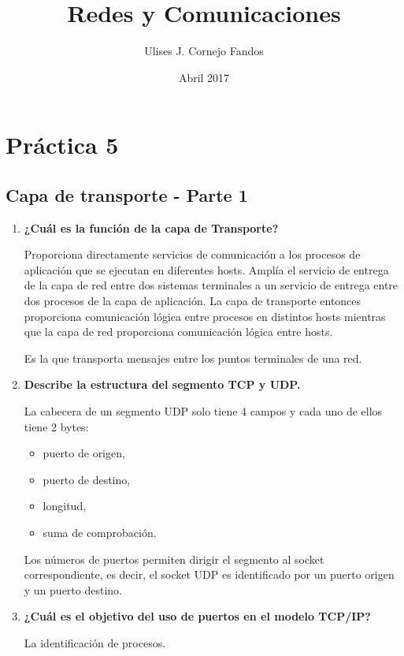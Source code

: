 \documentclass[a4paper,10pt]{article}
\title{Redes y Comunicaciones}
\author{Ulises J. Cornejo Fandos}
\date{Abril 2017}
\begin{document}
\maketitle

\section{Práctica 5}

\subsection{Capa de transporte - Parte 1}

\begin{enumerate}
    \item \textbf{¿Cuál es la función de la capa de Transporte?}
    
    Proporciona directamente servicios de comunicación a los procesos de aplicación que se ejecutan en diferentes hosts. Amplía el servicio de entrega de la capa de red entre dos sistemas terminales a un servicio de entrega entre dos procesos de la capa de aplicación. La capa de transporte entonces proporciona comunicación lógica entre procesos en distintos hosts mientras que la capa de red proporciona comunicación lógica entre hosts.
    
    Es la que transporta mensajes entre los puntos terminales de una red.
    
    \item \textbf{Describe la estructura del segmento TCP y UDP.}
    
    La cabecera de un segmento UDP solo tiene 4 campos y cada uno de ellos tiene 2 bytes:
        \begin{itemize}
            \item puerto de origen,
            \item puerto de destino, 
            \item longitud,
            \item suma de comprobación.
        \end{itemize}    
    
    Los números de puertos permiten dirigir el segmento al socket correspondiente, es decir, el socket UDP es identificado por un puerto origen y un puerto destino.
    
    \item \textbf{¿Cuál es el objetivo del uso de puertos en el modelo TCP/IP?}
    
    La identificación de procesos.
    

\end{enumerate}
\end{document}
